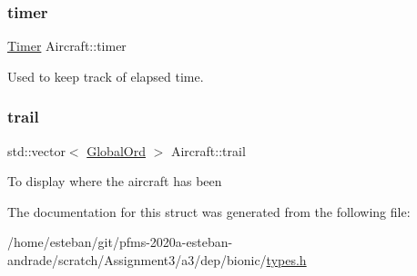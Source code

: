 \subsubsection{\texorpdfstring{timer}{timer}}
{\footnotesize\ttfamily \hyperlink{classTimer}{Timer} Aircraft\+::timer}

Used to keep track of elapsed time. \mbox{\label{structAircraft_a5bb8eeef2d86c60fb64bb4d6b55ac594}} 
\subsubsection{\texorpdfstring{trail}{trail}}
{\footnotesize\ttfamily std\+::vector$<$ \hyperlink{structGlobalOrd}{Global\+Ord} $>$ Aircraft\+::trail}

To display where the aircraft has been 

The documentation for this struct was generated from the following file\+:\begin{DoxyCompactItemize}
\item 
/home/esteban/git/pfms-\/2020a-\/esteban-\/andrade/scratch/\+Assignment3/a3/dep/bionic/\hyperlink{bionic_2types_8h}{types.\+h}\end{DoxyCompactItemize}
